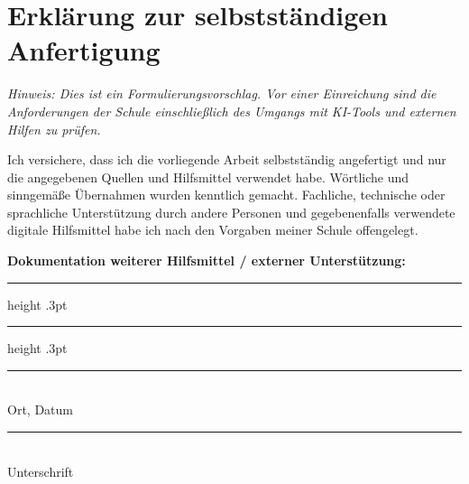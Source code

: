 \chapter*{Erklärung zur selbstständigen Anfertigung}
\thispagestyle{plain}

\textit{Hinweis: Dies ist ein Formulierungsvorschlag. Vor einer
Einreichung sind die Anforderungen der Schule einschließlich des
Umgangs mit KI-Tools und externen Hilfen zu prüfen.}

\vspace{1cm}
Ich versichere, dass ich die vorliegende Arbeit selbstständig
angefertigt und nur die angegebenen Quellen und Hilfsmittel verwendet
habe. Wörtliche und sinngemäße Übernahmen wurden kenntlich gemacht.
Fachliche, technische oder sprachliche Unterstützung durch andere
Personen und gegebenenfalls verwendete digitale Hilfsmittel habe ich
nach den Vorgaben meiner Schule offengelegt.

\vspace{.9cm}
\noindent\textbf{Dokumentation weiterer Hilfsmittel / externer Unterstützung:}\par
\vspace{.55cm}
\hrule height .3pt
\vspace{.5cm}
\hrule height .3pt

\vfill
\noindent\begin{minipage}[t]{.46\textwidth}
  \rule{\linewidth}{.4pt}\\Ort, Datum
\end{minipage}\hfill%
\begin{minipage}[t]{.46\textwidth}
  \rule{\linewidth}{.4pt}\\Unterschrift
\end{minipage}
\vspace{1.3cm}
